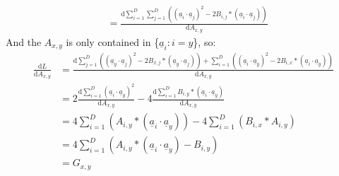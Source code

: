 \documentclass[11pt,letterpaper]{article}
\begin{document}
\begin{enumerate}
\begin{enumerate}
\begin{align*}
         &= \frac{
            \mathrm{d} \sum_{i=1}^D \sum_{j=1}^D
            ((\underline a_i \cdot \underline a_j)^2 - 2B_{i,j}*(\underline a_i \cdot \underline a_j))
         }{
            \mathrm{d} A_{x,y}
         }
    \end{align*}
    And the $A_{x,y}$ is only contained in \{$\underline a_i: i=y$\}, so:
    \begin{align*}
         \frac{\mathrm{d} L}{\mathrm{d} A_{x,y}} &= \frac{
            \mathrm{d} \sum_{j=1}^D
            ((\underline a_y \cdot \underline a_j)^2 - 2B_{x,j}*(\underline a_y \cdot \underline a_j))
            +
            \sum_{i=1}^D
            ((\underline a_i \cdot \underline a_y)^2 - 2B_{i,x}*(\underline a_i \cdot \underline a_y))
         }{
            \mathrm{d} A_{x,y}
         }\\
         &= 2\frac{
            \mathrm{d} \sum_{i=1}^D
            (\underline a_i \cdot \underline a_y)^2
         }{
            \mathrm{d} A_{x,y}
         } -
         4\frac{
            \mathrm{d} \sum_{i=1}^D B_{i,y}*(\underline a_i \cdot \underline a_y)
         }{
            \mathrm{d} A_{x,y}
         }\\
         &= 
          4\sum_{i=1}^D (A_{i,y}*(\underline a_i \cdot \underline a_y)) - 4\sum_{i=1}^D (B_{i,x}*A_{i,y}) \\
          &= 
          4\sum_{i=1}^D (A_{i,y}*(\underline a_i \cdot \underline a_y) - B_{i,y})
          \\
          &=G_{x,y}
    \end{align*}  
    \newpage


\end{enumerate}
\end{enumerate}
\end{document}
